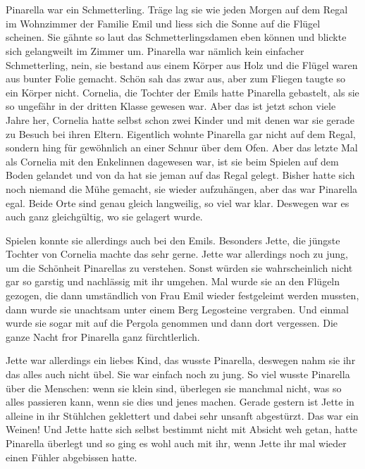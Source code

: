 \chapter*{}
\lettrine[lines=2]{\color{red}P}{}inarella war ein Schmetterling. Träge lag sie wie jeden Morgen auf dem Regal im Wohnzimmer der Familie Emil und liess sich die Sonne auf die Flügel scheinen. Sie gähnte so laut das Schmetterlingsdamen eben können und blickte sich gelangweilt im Zimmer um. Pinarella war nämlich kein einfacher Schmetterling, nein, sie bestand aus einem Körper aus Holz und die Flügel waren aus bunter Folie gemacht. Schön sah das zwar aus, aber zum Fliegen taugte so ein Körper nicht. Cornelia, die Tochter der Emils hatte Pinarella gebastelt, als sie so ungefähr in der dritten Klasse gewesen war. Aber das ist jetzt schon viele Jahre her, Cornelia hatte selbst schon zwei Kinder und mit denen war sie gerade zu Besuch bei ihren Eltern. Eigentlich wohnte Pinarella gar nicht auf dem Regal, sondern hing für gewöhnlich an einer Schnur über dem Ofen. Aber das letzte Mal als Cornelia mit den Enkelinnen dagewesen war, ist sie beim Spielen auf dem Boden gelandet und von da hat sie jeman auf das Regal gelegt. Bisher hatte sich noch niemand die Mühe gemacht, sie wieder aufzuhängen, aber das war Pinarella egal. Beide Orte sind genau gleich langweilig, so viel war klar. Deswegen war es auch ganz gleichgültig, wo sie gelagert wurde.


Spielen konnte sie allerdings auch bei den Emils. Besonders Jette, die jüngste Tochter von Cornelia machte das sehr gerne.  Jette war allerdings noch zu jung, um die Schönheit Pinarellas zu verstehen. Sonst würden sie wahrscheinlich nicht gar so garstig und nachlässig mit ihr umgehen. Mal wurde sie an den Flügeln gezogen, die dann umständlich von Frau Emil wieder festgeleimt werden mussten, dann wurde sie unachtsam unter einem Berg Legosteine vergraben. Und einmal wurde sie sogar mit auf die Pergola genommen und dann dort vergessen. Die ganze Nacht fror Pinarella ganz fürchtlerlich.

Jette war allerdings ein liebes Kind, das wusste Pinarella, deswegen nahm sie ihr das alles auch nicht übel. Sie war einfach noch zu jung. So viel wusste Pinarella über die Menschen: wenn sie klein sind, überlegen sie manchmal nicht, was so alles passieren kann, wenn sie dies und jenes machen. Gerade gestern ist Jette in alleine in ihr Stühlchen geklettert und dabei sehr unsanft abgestürzt. Das war ein Weinen! Und Jette hatte sich selbst bestimmt nicht mit Absicht weh getan, hatte Pinarella überlegt und so ging es wohl auch mit ihr, wenn Jette ihr mal wieder einen Fühler abgebissen hatte.

